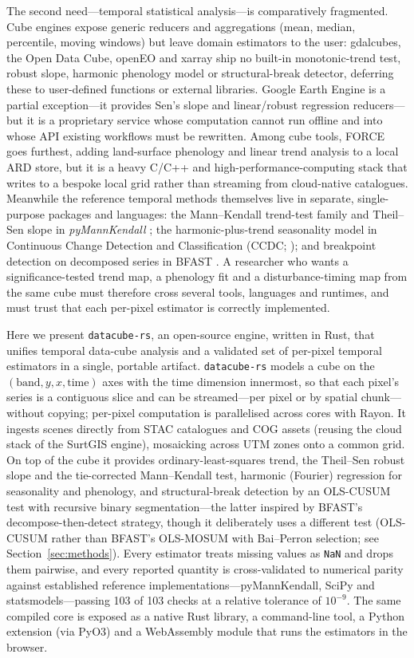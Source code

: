 \documentclass[review]{elsarticle}
\begin{document}
The second need---temporal statistical analysis---is comparatively fragmented.
Cube engines expose generic reducers and aggregations (mean, median, percentile,
moving windows) but leave domain estimators to the user: gdalcubes, the Open Data
Cube, openEO and xarray ship no built-in monotonic-trend test, robust slope,
harmonic phenology model or structural-break detector, deferring these to
user-defined functions or external libraries. Google Earth Engine is a partial
exception---it provides Sen's slope and linear/robust regression reducers---but
it is a proprietary service whose computation cannot run offline and into whose
API existing workflows must be rewritten. Among cube tools, FORCE
\citep{frantz2019force} goes furthest, adding land-surface phenology and linear
trend analysis to a local ARD store, but it is a heavy C/C++ and
high-performance-computing stack that writes to a bespoke local grid rather than
streaming from cloud-native catalogues. Meanwhile the reference temporal methods
themselves live in separate, single-purpose packages and languages: the
Mann--Kendall trend-test family and Theil--Sen slope in \emph{pyMannKendall}
\citep{hussain2019pymannkendall}; the harmonic-plus-trend seasonality model in
Continuous Change Detection and Classification (CCDC; \citealp{zhu2014ccdc}); and
breakpoint detection on decomposed series in BFAST \citep{verbesselt2010bfast}. A
researcher who wants a significance-tested trend map, a phenology fit and a
disturbance-timing map from the same cube must therefore cross several tools,
languages and runtimes, and must trust that each per-pixel estimator is correctly
implemented.

Here we present \texttt{datacube-rs}, an open-source engine, written in Rust,
that unifies temporal data-cube analysis and a validated set of per-pixel
temporal estimators in a single, portable artifact. \texttt{datacube-rs} models a
cube on the $(\text{band}, y, x, \text{time})$ axes with the time dimension
innermost, so that each pixel's series is a contiguous slice and can be
streamed---per pixel or by spatial chunk---without copying; per-pixel computation
is parallelised across cores with Rayon. It ingests scenes directly from STAC
catalogues and COG assets (reusing the cloud stack of the SurtGIS engine),
mosaicking across UTM zones onto a common grid. On top of the cube it provides
ordinary-least-squares trend, the Theil--Sen robust slope and the tie-corrected
Mann--Kendall test, harmonic (Fourier) regression for seasonality and phenology,
and structural-break detection by an OLS-CUSUM test with recursive binary
segmentation---the latter inspired by BFAST's decompose-then-detect strategy,
though it deliberately uses a different test (OLS-CUSUM rather than BFAST's
OLS-MOSUM with Bai--Perron selection; see Section~\ref{sec:methods}). Every
estimator treats missing values as \texttt{NaN} and drops them pairwise, and
every reported quantity is cross-validated to numerical parity against
established reference implementations---pyMannKendall, SciPy and
statsmodels---passing 103 of 103 checks at a relative tolerance of
$10^{-9}$. The same compiled core is exposed as a native Rust library, a
command-line tool, a Python extension (via PyO3) and a WebAssembly module that
runs the estimators in the browser.
\end{document}
